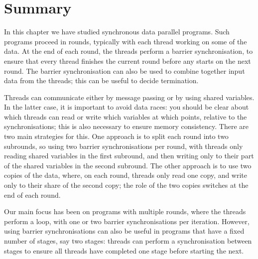 


\section{Summary}

In this chapter we have studied synchronous data parallel programs.  Such
programs proceed in rounds, typically with each thread working on some of the
data.  At the end of each round, the threads perform a barrier
synchronisation, to ensure that every thread finishes the current round before
any starts on the next round.  The barrier synchronisation can also be used to
combine together input data from the threads; this can be useful to decide
termination. 

Threads can communicate either by message passing or by using shared
variables.  In the latter case, it is important to avoid data races: you
should be clear about which threads can read or write which variables at which
points, relative to the synchronisations; this is also necessary to ensure
memory consistency.  There are two main strategies for this.  One approach is
to split each round into two subrounds, so using two barrier synchronisations
per round, with threads only reading shared variables in the first subround,
and then writing only to their part of the shared variables in the second
subround.  The other approach is to use two copies of the data, where, on each
round, threads only read one copy, and write only to their share of the second
copy; the role of the two copies switches at the end of each round.

Our main focus has been on programs with multiple rounds, where the
threads perform a loop, with one or two barrier synchronisations per
iteration.  However, using barrier synchronisations can also be useful in
programs that have a fixed number of stages, say two stages: threads can
perform a synchronisation between stages to ensure all threads have completed
one stage before starting the next. 




